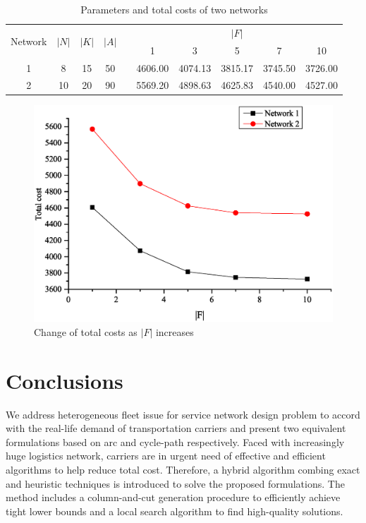 \documentclass[11pt,nonblindrev,fleqn]{article}
\begin{document}
\begin{table}[H]
\setlength{\abovecaptionskip}{-3pt}
\setlength{\belowcaptionskip}{5pt}
\centering
  \footnotesize
  \caption{Parameters and total costs of two networks}
  \label{heterogeneous}

\begin{tabular}{cccccccccc}
\hline
\multirow{2}[4]{*}{Network} & \multirow{2}[4]{*}{$|N|$} & \multirow{2}[4]{*}{$|K|$} & \multirow{2}[4]{*}{$|A|$} &       & \multicolumn{5}{c}{$|F|$} \bigstrut\\
\cline{6-10}      &       &       &       &       & 1     & 3     & 5     & 7     & 10 \bigstrut\\
\hline
1     & 8     & 15    & 50    &       & 4606.00  & 4074.13  & 3815.17  & 3745.50  & 3726.00  \bigstrut[t]\\
2     & 10    & 20    & 90    &       & 5569.20  & 4898.63  & 4625.83  & 4540.00  & 4527.00  \bigstrut[b]\\
\hline
\end{tabular}%

\end{table}%

\begin{figure}[H]
\setlength{\abovecaptionskip}{-5pt}
\setlength{\belowcaptionskip}{-5pt}
\centering
\includegraphics[width=0.9\linewidth]{F6.eps}
\caption{Change of total costs as $|F|$ increases}
\label{twoNetwork}
\end{figure}

\section{Conclusions}\label{conclusion}
We address heterogeneous fleet issue for service network design problem to accord with the real-life demand of transportation carriers and present two equivalent formulations based on arc and cycle-path respectively. Faced with increasingly huge logistics network, carriers are in urgent need of effective and efficient algorithms to help reduce total cost. Therefore, a hybrid algorithm combing exact and heuristic techniques is introduced to solve the proposed formulations. The method includes a column-and-cut generation procedure to efficiently achieve tight lower bounds and a local search algorithm to find high-quality solutions.
\end{document}

